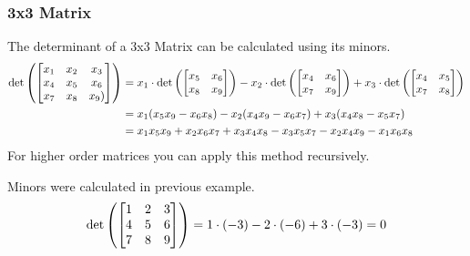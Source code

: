 \subsubsection{3x3 Matrix}
The determinant of a 3x3 Matrix can be calculated using its minors.
\begin{align*}
    \det \left( \begin{bmatrix}
            x_1 & x_2 & x_3  \\
            x_4 & x_5 & x_6  \\
            x_7 & x_8 & x_9) \\
        \end{bmatrix} \right) & = x_1 \cdot
    \det \left( \begin{bmatrix}
            x_5 & x_6 \\
            x_8 & x_9 \\
        \end{bmatrix} \right)- x_2 \cdot
    \det \left( \begin{bmatrix}
            x_4 & x_6 \\
            x_7 & x_9 \\
        \end{bmatrix} \right)+ x_3 \cdot \det \left( \begin{bmatrix}
            x_4 & x_5 \\
            x_7 & x_8 \\
        \end{bmatrix} \right)                                   \\
                                             & = x_1 (x_5x_9 - x_6 x_8) - x_2 (x_4 x_9 - x_6 x_7) + x_3 (x_4 x_8 - x_5 x_7)        \\
                                             & = x_1 x_5 x_9 + x_2 x_6 x_7 + x_3 x_4 x_8 - x_3 x_5 x_7 - x_2 x_4 x_9 - x_1 x_6 x_8
\end{align*}
For higher order matrices you can apply this method recursively.
\begin{example}
    Minors were calculated in previous example.
    \begin{align*}
        \det \left( \begin{bmatrix}
                1 & 2 & 3 \\
                4 & 5 & 6 \\
                7 & 8 & 9 \\
            \end{bmatrix} \right) & = 1 \cdot(-3) - 2 \cdot(-6) + 3 \cdot(-3) = 0 \\
    \end{align*}
\end{example}
